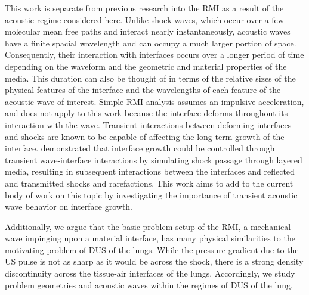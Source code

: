 This work is separate from previous research into the \ac{RMI} as a
result of the acoustic regime considered here. Unlike shock waves,
which occur over a few molecular mean free paths and interact nearly
instantaneously, acoustic waves have a finite spacial wavelength and
can occupy a much larger portion of space. Consequently, their
interaction with interfaces occurs over a longer period of time
depending on the waveform and the geometric and material properties of
the media. This duration can also be thought of in terms of the
relative sizes of the physical features of the interface and the
wavelengths of each feature of the acoustic wave of interest. Simple
\ac{RMI} analysis assumes an impulsive acceleration, and does not
apply to this work because the interface deforms throughout its
interaction with the wave. Transient interactions between deforming
interfaces and shocks are known to be capable of affecting the long
term growth of the interface. \cite{HenrydeFrahan2015b} demonstrated
that interface growth could be controlled through transient
wave-interface interactions by simulating shock passage through
layered media, resulting in subsequent interactions between the
interfaces and reflected and transmitted shocks and rarefactions.
This work aims to add to the current body of work on this topic by
investigating the importance of transient acoustic wave behavior on
interface growth.


Additionally, we argue that the basic problem setup of the \ac{RMI}, a
mechanical wave impinging upon a material interface, has many
physical similarities to the motivating problem of \ac{DUS} of the
lungs. While the pressure gradient due to the \ac{US} pulse is not as
sharp as it would be across the shock, there is a strong density
discontinuity across the tissue-air interfaces of the
lungs. Accordingly, we study problem geometries and acoustic waves
within the regimes of \ac{DUS} of the lung.

